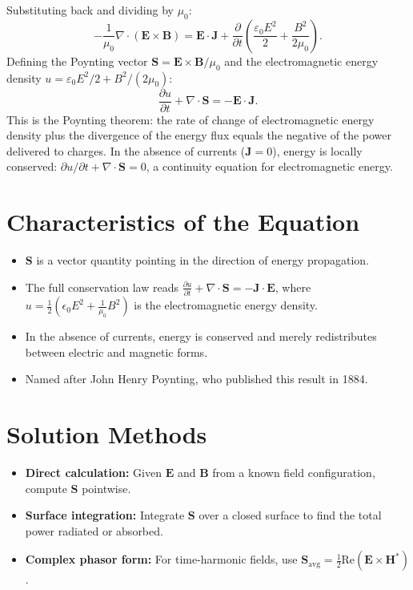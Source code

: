 Substituting back and dividing by $\mu_0$:
\begin{equation}
-\frac{1}{\mu_0}\nabla\cdot(\mathbf{E}\times\mathbf{B}) = \mathbf{E}\cdot\mathbf{J} + \frac{\partial}{\partial t}\!\left(\frac{\varepsilon_0 E^{2}}{2} + \frac{B^{2}}{2\mu_0}\right).
\end{equation}
Defining the Poynting vector $\mathbf{S} = \mathbf{E}\times\mathbf{B}/\mu_0$ and the electromagnetic energy density $u = \varepsilon_0 E^{2}/2 + B^{2}/(2\mu_0)$:
\begin{equation}
\boxed{\;\frac{\partial u}{\partial t} + \nabla\cdot\mathbf{S} = -\mathbf{E}\cdot\mathbf{J}.\;}
\end{equation}
This is the Poynting theorem: the rate of change of electromagnetic energy density plus the divergence of the energy flux equals the negative of the power delivered to charges. In the absence of currents ($\mathbf{J} = 0$), energy is locally conserved: $\partial u/\partial t + \nabla\cdot\mathbf{S} = 0$, a continuity equation for electromagnetic energy.

\section*{Characteristics of the Equation}

\begin{itemize}
    \item $\mathbf{S}$ is a vector quantity pointing in the direction of energy propagation.
    \item The full conservation law reads $\frac{\partial u}{\partial t} + \nabla \cdot \mathbf{S} = -\mathbf{J} \cdot \mathbf{E}$, where $u = \frac{1}{2}(\epsilon_0 E^2 + \frac{1}{\mu_0}B^2)$ is the electromagnetic energy density.
    \item In the absence of currents, energy is conserved and merely redistributes between electric and magnetic forms.
    \item Named after John Henry Poynting, who published this result in 1884.
\end{itemize}
\section*{Solution Methods}

\begin{itemize}
    \item \textbf{Direct calculation:} Given $\mathbf{E}$ and $\mathbf{B}$ from a known field configuration, compute $\mathbf{S}$ pointwise.
    \item \textbf{Surface integration:} Integrate $\mathbf{S}$ over a closed surface to find the total power radiated or absorbed.
    \item \textbf{Complex phasor form:} For time-harmonic fields, use $\mathbf{S}_{\text{avg}} = \frac{1}{2}\text{Re}(\mathbf{E} \times \mathbf{H}^*)$.
\end{itemize}
